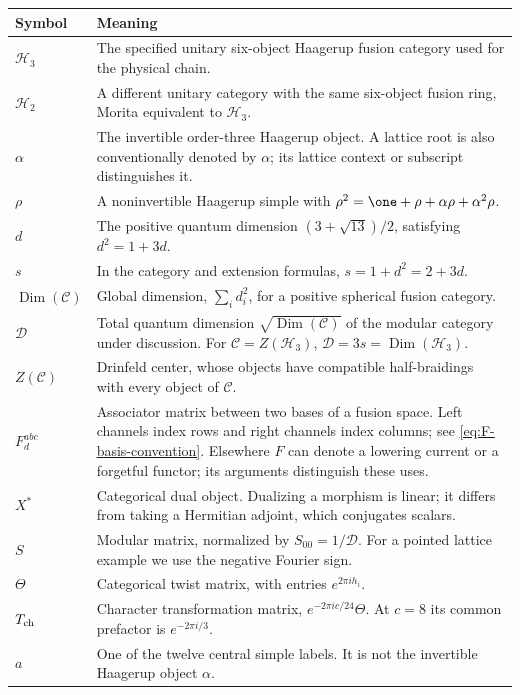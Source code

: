 \begin{longtable}{p{}p{}}
\toprule Symbol&Meaning\\\midrule
\endhead
$\mathcal H_3$&The specified unitary six-object Haagerup
fusion category used for the physical chain.\\
$\mathcal H_2$&A different unitary category with the same
six-object fusion ring, Morita equivalent to $\mathcal H_3$.\\
$\alpha$&The invertible order-three Haagerup object. A lattice
root is also conventionally denoted by $\alpha$; its lattice
context or subscript distinguishes it.\\
$\rho$&A noninvertible Haagerup simple with
$\rho^2=\one+\rho+\alpha\rho+\alpha^2\rho$.\\
$d$&The positive quantum dimension
$(3+\sqrt{13})/2$, satisfying $d^2=1+3d$.\\
$s$&In the category and extension formulas,
$s=1+d^2=2+3d$.\\
$\operatorname{Dim}(\mathcal C)$&Global dimension,
$\sum_i d_i^2$, for a positive spherical fusion category.\\
$\mathcal D$&Total quantum dimension
$\sqrt{\operatorname{Dim}(\mathcal C)}$ of the modular category
under discussion. For $\mathcal C=Z(\mathcal H_3)$,
$\mathcal D=3s=\operatorname{Dim}(\mathcal H_3)$.\\
$Z(\mathcal C)$&Drinfeld center, whose objects have compatible
half-braidings with every object of $\mathcal C$.\\
$F^{abc}_d$&Associator matrix between two bases of a fusion
space. Left channels index rows and right channels index columns;
see \eqref{eq:F-basis-convention}.
Elsewhere $F$ can denote a lowering current or a forgetful
functor; its arguments distinguish these uses.\\
$X^*$&Categorical dual object. Dualizing a morphism is linear;
it differs from taking a Hermitian adjoint, which conjugates scalars.\\
$S$&Modular matrix, normalized by $S_{00}=1/\mathcal D$.
For a pointed lattice example we use the negative Fourier sign.\\
$\Theta$&Categorical twist matrix, with entries
$e^{2\pi ih_i}$.\\
$T_{\rm ch}$&Character transformation matrix,
$e^{-2\pi ic/24}\Theta$. At $c=8$ its common prefactor is
$e^{-2\pi i/3}$.\\
$a$&One of the twelve central simple labels. It is not the
invertible Haagerup object $\alpha$.\\

\end{longtable}
